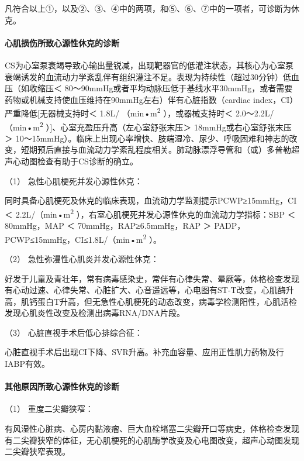 凡符合以上①，以及②、③、④中的两项，和⑤、⑥、⑦中的一项者，可诊断为休克。

\paragraph{心肌损伤所致心源性休克的诊断}

CS为心室泵衰竭导致心输出量锐减，出现靶器官的低灌注状态，其核心为心室泵衰竭诱发的血流动力学紊乱伴有组织灌注不足。表现为持续性（超过30分钟）低血压（如收缩压＜
80～90mmHg或者平均动脉压低于基线水平30mmHg，或者需要药物或机械支持使血压维持在90mmHg左右）伴有心脏指数（cardiac
index，CI）严重降低{[}无器械支持时＜ 1.8L/ （min•m\textsuperscript{2}
），或器械支持时＜ 2.0～2.2L/（min•m\textsuperscript{2}
）{]}、心室充盈压升高（左心室舒张末压＞ 18mmHg或右心室舒张末压＞
10～15mmHg）。临床上出现心率增快、肢端湿冷、尿少、呼吸困难和神志的改变，短期预后直接与血流动力学紊乱程度相关。肺动脉漂浮导管和（或）多普勒超声心动图检查有助于CS诊断的确立。

\hypertarget{text00059.htmlux5cux23CHP2-3-2-3-2-1}{}
（1） 急性心肌梗死并发心源性休克：

同时具备心肌梗死及休克的临床表现，血流动力学监测提示PCWP≥15mmHg，CI ＜
2.2L/（min•m\textsuperscript{2}
），右室心肌梗死并发心源性休克的血流动力学指标：SBP ＜ 80mmHg，MAP ＜
70mmHg，RAP≥6.5mmHg，RAP ＞
PADP，PCWP≤15mmHg，CI≤1.8L/（min•m\textsuperscript{2} ）。

\hypertarget{text00059.htmlux5cux23CHP2-3-2-3-2-2}{}
（2） 急性弥漫性心肌炎并发心源性休克：

好发于儿童及青壮年，常有病毒感染史，常伴有心律失常、晕厥等，体格检查发现有心动过速、心律失常、心脏扩大、心音遥远等，心电图有ST-T改变，心肌酶升高，肌钙蛋白T升高，但无急性心肌梗死的动态改变，病毒学检测阳性，心肌活检发现心肌炎性改变及检测出病毒RNA/DNA片段。

\hypertarget{text00059.htmlux5cux23CHP2-3-2-3-2-3}{}
（3） 心脏直视手术后低心排综合征：

心脏直视手术后出现CI下降、SVR升高。补充血容量、应用正性肌力药物及行IABP有效。

\paragraph{其他原因所致心源性休克的诊断}

\hypertarget{text00059.htmlux5cux23CHP2-3-2-3-3-1}{}
（1） 重度二尖瓣狭窄：

有风湿性心脏病、心房内黏液瘤、巨大血栓堵塞二尖瓣开口等病史，体格检查发现有二尖瓣狭窄的体征，无心肌梗死的心肌酶学改变及心电图改变，超声心动图发现二尖瓣狭窄表现。

